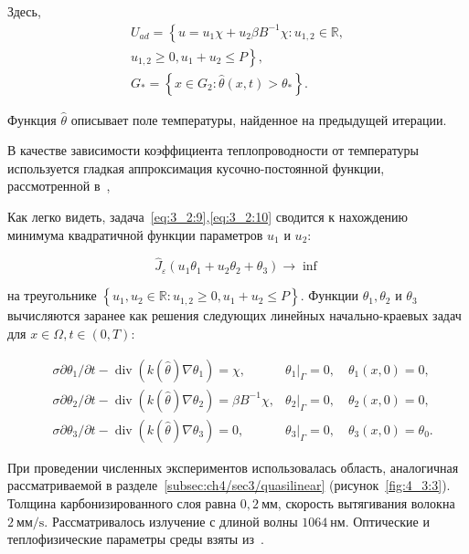 Здесь,
\[
    \begin{gathered}
        U_{a d}=\left\{u=u_{1} \chi+u_{2} \beta B^{-1} \chi: u_{1,2} \in \mathbb{R},\right. \\
        \left.u_{1,2} \geq 0, u_{1}+u_{2} \leq P\right\}, \\
        G_{*}=\left\{x \in G_{2}: \hat{\theta}(x, t)>\theta_{*}\right\}.
    \end{gathered}
\]

Функция $\widehat{\theta}$ описывает поле температуры,
найденное на предыдущей итерации.

В качестве зависимости коэффициента теплопроводности от температуры используется
гладкая аппроксимация кусочно-постоянной функции, рассмотренной
в~\cite{Opticalthermal_vanRuijven2014, Some_Poluektova2014, Endovenous_Malskat2014},

Как легко видеть, задача~\eqref{eq:3_2:9},\eqref{eq:3_2:10} сводится к
нахождению минимума квадратичной функции параметров $u_{1}$ и $u_{2}$:

\[
    \widehat{J}_{\varepsilon}\left(u_{1} \theta_{1}+u_{2} \theta_{2}+\theta_{3}\right) \rightarrow \inf
\]

на треугольнике  $\left\{u_{1}, u_{2} \in \mathbb{R}:
u_{1,2} \geq 0, u_{1}+u_{2} \leq P\right\}$.
Функции $\theta_{1}, \theta_{2}$ и $\theta_{3}$
вычисляются заранее как решения следующих линейных
начально-краевых задач для $x \in \Omega, t \in(0, T)$:


\[
    \begin{aligned}
        &\sigma \partial \theta_{1} / \partial t-\operatorname{div}\left(k(\widehat{\theta})
        \nabla \theta_{1}\right)=\chi, &
        \left.\theta_{1}\right|_{\Gamma}=0, \quad \theta_{1}(x, 0)=0, \\
        &\sigma \partial \theta_{2} / \partial t-\operatorname{div}\left(k(\widehat{\theta})
        \nabla \theta_{2}\right)=\beta B^{-1} \chi, &
        \left.\theta_{2}\right|_{\Gamma}=0, \quad \theta_{2}(x, 0)=0, \\
        &\sigma \partial \theta_{3} / \partial t-\operatorname{div}\left(k(\widehat{\theta})
        \nabla \theta_{3}\right)=0, &
        \left.\theta_{3}\right|_{\Gamma}=0, \quad \theta_{3}(x, 0)=\theta_{0}.
    \end{aligned}
\]

При проведении численных экспериментов использовалась область,
аналогичная рассматриваемой в разделе~\ref{subsec:ch4/sec3/quasilinear}
(рисунок~\ref{fig:4_3:3}).
Толщина карбонизированного слоя равна $0,2 \mathrm{~мм}$,
скорость вытягивания волокна $2 \mathrm{~мм}/\mathrm{s}$.
Рассматривалось излучение с длиной волны $1064 \mathrm{~нм}$.
Оптические и теплофизические параметры среды взяты
из~\cite{Opticalthermal_vanRuijven2014, Some_Poluektova2014, Endovenous_Malskat2014}.


